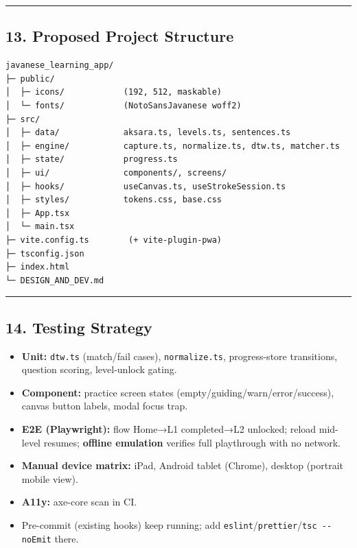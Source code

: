 \documentclass[
  11pt,
]{article}
\providecommand{\tightlist}{%
  \setlength{\itemsep}{0pt}\setlength{\parskip}{0pt}}
\begin{document}
\begin{center}\rule{0.5\linewidth}{0.5pt}\end{center}

\subsection{13. Proposed Project
Structure}\label{proposed-project-structure}

\begin{verbatim}
javanese_learning_app/
├─ public/
│  ├─ icons/            (192, 512, maskable)
│  └─ fonts/            (NotoSansJavanese woff2)
├─ src/
│  ├─ data/             aksara.ts, levels.ts, sentences.ts
│  ├─ engine/           capture.ts, normalize.ts, dtw.ts, matcher.ts
│  ├─ state/            progress.ts
│  ├─ ui/               components/, screens/
│  ├─ hooks/            useCanvas.ts, useStrokeSession.ts
│  ├─ styles/           tokens.css, base.css
│  ├─ App.tsx
│  └─ main.tsx
├─ vite.config.ts        (+ vite-plugin-pwa)
├─ tsconfig.json
├─ index.html
└─ DESIGN_AND_DEV.md
\end{verbatim}

\begin{center}\rule{0.5\linewidth}{0.5pt}\end{center}

\subsection{14. Testing Strategy}\label{testing-strategy}

\begin{itemize}
\tightlist
\item
  \textbf{Unit:} \texttt{dtw.ts} (match/fail cases),
  \texttt{normalize.ts}, progress-store transitions, question scoring,
  level-unlock gating.
\item
  \textbf{Component:} practice screen states
  (empty/guiding/warn/error/success), canvas button labels, modal focus
  trap.
\item
  \textbf{E2E (Playwright):} flow Home→L1 completed→L2 unlocked; reload
  mid-level resumes; \textbf{offline emulation} verifies full
  playthrough with no network.
\item
  \textbf{Manual device matrix:} iPad, Android tablet (Chrome), desktop
  (portrait mobile view).
\item
  \textbf{A11y:} axe-core scan in CI.
\item
  Pre-commit (existing hooks) keep running; add
  \texttt{eslint}/\texttt{prettier}/\texttt{tsc\ -\/-noEmit} there.
\end{itemize}
\end{document}

